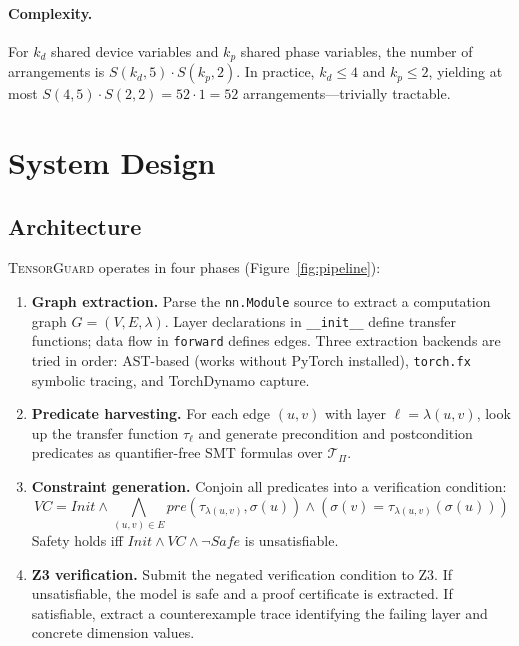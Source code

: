 \documentclass[10pt]{article}
\newcommand{\tguard}{\textsc{TensorGuard}}
\newcommand{\Tprod}{\mathcal{T}_{\Pi}}
\theoremstyle{plain}
\theoremstyle{definition}
\theoremstyle{remark}
\begin{document}
\paragraph{Complexity.}
For $k_d$ shared device variables and $k_p$ shared phase variables,
the number of arrangements is
$S(k_d, 5) \cdot S(k_p, 2)$.  In practice, $k_d \leq 4$ and
$k_p \leq 2$, yielding at most $S(4, 5) \cdot S(2, 2) = 52 \cdot 1
= 52$ arrangements---trivially tractable.


\section{System Design}\label{sec:design}

\subsection{Architecture}

\tguard{} operates in four phases (Figure~\ref{fig:pipeline}):

\begin{enumerate}[leftmargin=2em]
  \item \textbf{Graph extraction.}  Parse the \texttt{nn.Module}
    source to extract a computation graph $G = (V, E, \lambda)$.
    Layer declarations in \texttt{\_\_init\_\_} define transfer
    functions; data flow in \texttt{forward} defines edges.
    Three extraction backends are tried in order: AST-based
    (works without PyTorch installed), \texttt{torch.fx} symbolic
    tracing, and TorchDynamo capture.

  \item \textbf{Predicate harvesting.}  For each edge $(u, v)$
    with layer $\ell = \lambda(u, v)$, look up the transfer
    function $\tau_\ell$ and generate precondition and postcondition
    predicates as quantifier-free SMT formulas over $\Tprod$.

  \item \textbf{Constraint generation.}  Conjoin all predicates
    into a verification condition:
    \[
      \mathit{VC} = \mathit{Init} \land
        \bigwedge_{(u,v) \in E} \mathit{pre}(\tau_{\lambda(u,v)},
        \sigma(u)) \land
        (\sigma(v) = \tau_{\lambda(u,v)}(\sigma(u)))
    \]
    Safety holds iff $\mathit{Init} \land \mathit{VC} \land
    \neg\mathit{Safe}$ is unsatisfiable.

  \item \textbf{Z3 verification.}  Submit the negated verification
    condition to Z3.  If unsatisfiable, the model is safe and a
    proof certificate is extracted.  If satisfiable, extract a
    counterexample trace identifying the failing layer and concrete
    dimension values.
\end{enumerate}
\end{document}
